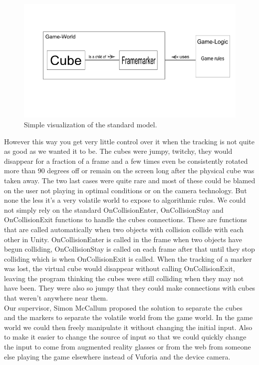 \begin{figure}[ht] 
        \capstart
        \centering  
        \includegraphics[width=\textwidth]{images/simpleCubeMarkerModel.png}    
        \caption[Standard Cube-Marker model]{Simple visualization of the standard model.} 
        \label{fig:simple_cube_marker_model} 
\end{figure}

However this way you get very little control over it when the tracking is not quite as good as we wanted it to be. The cubes were jumpy, twitchy, they would disappear for a fraction of a frame and a few times even be consistently rotated more than 90 degrees off or remain on the screen long after the physical cube was taken away. 
The two last cases were quite rare and most of these could be blamed on the user not playing in optimal conditions or on the camera technology.
But none the less it's a very volatile world to expose to algorithmic rules. 
We could not simply rely on the standard OnCollisionEnter, OnCollisionStay and  OnCollisionExit functions to handle the cubes connections.
These are functions that are called automatically when two objects with collision collide with each other in Unity.
OnCollisionEnter is called in the frame when two objects have begun colliding, OnCollisionStay is called on each frame after that until they stop colliding which is when OnCollisionExit is called.
When the tracking of a marker was lost, the virtual cube would disappear without calling OnCollisionExit, leaving the program thinking the cubes were still colliding when they may not have been. 
They were also so jumpy that they could make connections with cubes that weren't anywhere near them.\\
Our supervisor, Simon McCallum proposed the solution to separate the cubes and the markers to separate the volatile world from the game world. 
In the game world we could then freely manipulate it without changing the initial input. 
Also to make it easier to change the source of input so that we could quickly change the input to come from augmented reality glasses or from the web from someone else playing the game elsewhere instead of Vuforia and the device camera.

